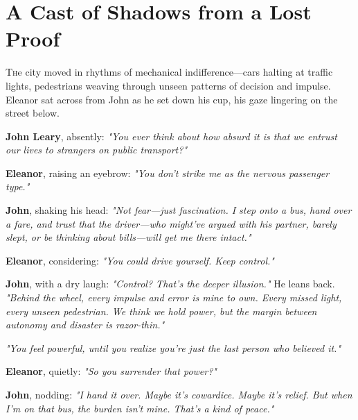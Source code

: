 \chapter{A Cast of Shadows from a Lost Proof}

\lettrine{T}he city moved in rhythms of mechanical indifference—cars halting at traffic lights, pedestrians weaving through unseen patterns of decision and impulse. Eleanor sat across from John as he set down his cup, his gaze lingering on the street below.

\bigskip

\textbf{John Leary}, absently: \textit{"You ever think about how absurd it is that we entrust our lives to strangers on public transport?"}

\bigskip

\textbf{Eleanor}, raising an eyebrow: \textit{"You don’t strike me as the nervous passenger type."}

\bigskip

\textbf{John}, shaking his head: \textit{"Not fear—just fascination. I step onto a bus, hand over a fare, and trust that the driver—who might’ve argued with his partner, barely slept, or be thinking about bills—will get me there intact."}

\bigskip

\textbf{Eleanor}, considering: \textit{"You could drive yourself. Keep control."}

\bigskip

\textbf{John}, with a dry laugh: \textit{"Control? That’s the deeper illusion."} He leans back. \textit{"Behind the wheel, every impulse and error is mine to own. Every missed light, every unseen pedestrian. We think we hold power, but the margin between autonomy and disaster is razor-thin."}

\bigskip

\textit{"You feel powerful, until you realize you’re just the last person who believed it."}

\bigskip

\textbf{Eleanor}, quietly: \textit{"So you surrender that power?"}

\bigskip

\textbf{John}, nodding: \textit{"I hand it over. Maybe it’s cowardice. Maybe it’s relief. But when I’m on that bus, the burden isn’t mine. That’s a kind of peace."}

